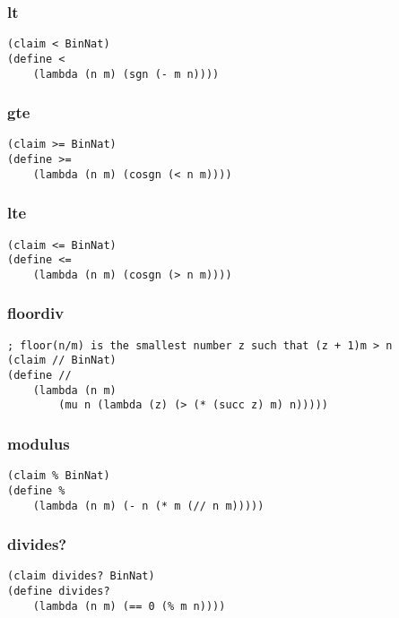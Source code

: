 \subsubsection{lt} \label{code:lt}
\begin{verbatim}
(claim < BinNat)
(define <
    (lambda (n m) (sgn (- m n))))
\end{verbatim}

\subsubsection{gte} \label{code:gte}
\begin{verbatim}
(claim >= BinNat)
(define >=
    (lambda (n m) (cosgn (< n m))))
\end{verbatim}

\subsubsection{lte} \label{code:lte}
\begin{verbatim}
(claim <= BinNat)
(define <=
    (lambda (n m) (cosgn (> n m))))
\end{verbatim}

\subsubsection{floordiv} \label{code:floordiv}
\begin{verbatim}
; floor(n/m) is the smallest number z such that (z + 1)m > n
(claim // BinNat)
(define //
    (lambda (n m)
        (mu n (lambda (z) (> (* (succ z) m) n)))))
\end{verbatim}

\subsubsection{modulus} \label{code:modulus}
\begin{verbatim}
(claim % BinNat)
(define %
    (lambda (n m) (- n (* m (// n m)))))
\end{verbatim}

\subsubsection{divides?} \label{code:divides?}
\begin{verbatim}
(claim divides? BinNat)
(define divides?
    (lambda (n m) (== 0 (% m n))))
\end{verbatim}

